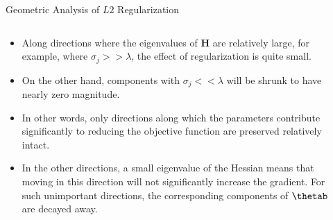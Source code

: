 \documentclass[11pt,compress,t,notes=noshow, xcolor=table]{beamer}
\begin{document}
\begin{vbframe}{Geometric Analysis of $L2$ Regularization}
\begin{columns}
\begin{column}{0.5\textwidth}
      {\scriptsize
      \begin{itemize}\setlength{\itemsep}{1.0em}
          \item Along directions where the eigenvalues of $\bm{H}$ are relatively large, for example, where $\sigma_j >> \lambda$, the effect of regularization is quite small.
  \item On the other hand, components with $\sigma_j << \lambda$ will be shrunk to have nearly zero magnitude.
  \item In other words, only directions along which the parameters contribute significantly to reducing the objective function are preserved relatively intact.
  \item In the other directions, a small eigenvalue of the Hessian means that moving in this direction will not significantly increase the gradient. For such unimportant directions, the corresponding components of $\thetab$ are decayed away.
        \end{itemize}
      }
      \end{column}
    
      \begin{column}{0.5\textwidth}
      

\end{column}
\end{columns}
\end{vbframe}
\end{document}
